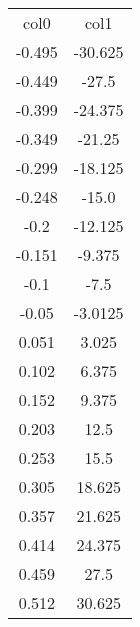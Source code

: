 \begin{table}
\begin{tabular}{cc}
col0 & col1 \\
-0.495 & -30.625 \\
-0.449 & -27.5 \\
-0.399 & -24.375 \\
-0.349 & -21.25 \\
-0.299 & -18.125 \\
-0.248 & -15.0 \\
-0.2 & -12.125 \\
-0.151 & -9.375 \\
-0.1 & -7.5 \\
-0.05 & -3.0125 \\
0.051 & 3.025 \\
0.102 & 6.375 \\
0.152 & 9.375 \\
0.203 & 12.5 \\
0.253 & 15.5 \\
0.305 & 18.625 \\
0.357 & 21.625 \\
0.414 & 24.375 \\
0.459 & 27.5 \\
0.512 & 30.625 \\
\end{tabular}
\end{table}
